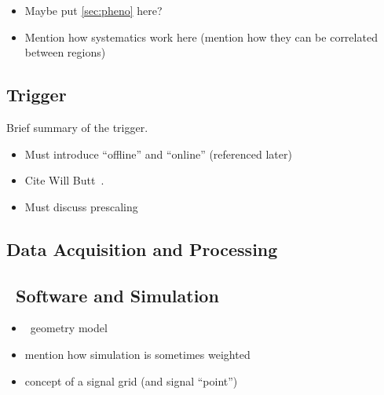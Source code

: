 \begin{itemize}
\item Maybe put \cref{sec:pheno} here?
\item Mention how systematics work here (mention how they can be correlated between regions)
\end{itemize}
\subsection{Trigger}
\label{sec:trigger}
Brief summary of the trigger.
\begin{itemize}
\item Must introduce ``offline'' and ``online'' (referenced later)
\item Cite Will Butt~\cite{atlas-lvl1}.
\item Must discuss prescaling
\end{itemize}
\subsection{Data Acquisition and Processing}
\subsection{\atlas\ Software and Simulation}
\label{sec:software}
\begin{itemize}
\item \atlas\ geometry model
\item mention how simulation is sometimes weighted
\item concept of a signal grid (and signal ``point'')
\end{itemize}
